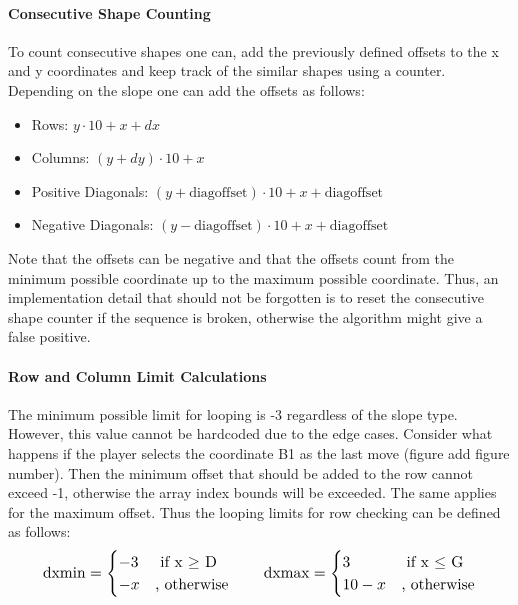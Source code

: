 \documentclass[conference]{IEEEtran}
\begin{document}
\paragraph{Consecutive Shape Counting}
To count consecutive shapes one can, add the previously defined offsets to the x and y coordinates and keep track of the similar shapes using a counter. Depending on the slope one can add the offsets as follows:
\begin{itemize}
\item Rows: \(y \cdot 10 + x + dx \)
\item Columns: \((y + dy) \cdot 10 + x\) 
\item Positive Diagonals: \((y + \text{diagoffset}) \cdot 10 + x + \text{diagoffset}\)
\item Negative Diagonals: \((y - \text{diagoffset}) \cdot 10 + x + \text{diagoffset}\)
\end{itemize} \hfill \hfill
\par Note that the offsets can be negative and that the offsets count from the minimum possible coordinate up to the maximum possible coordinate. Thus, an implementation detail that should not be forgotten is to reset the consecutive shape counter if the sequence is broken, otherwise the algorithm might give a false positive. \\
\paragraph{Row and Column Limit Calculations} The minimum possible limit for looping is -3 regardless of the slope type. However, this value cannot be hardcoded due to the edge cases. Consider what happens if the player selects the coordinate B1 as the last move (figure add figure number). Then the minimum offset that should be added to the row cannot exceed -1, otherwise the array index bounds will be exceeded. The same applies for the maximum offset. Thus the looping limits for row checking can be defined as follows: \begin{equation}\resizebox{0.9\hsize}{!}{$
\text{dxmin} =
\begin{cases}
 -3 &\text{ if x \(\geq\) D} \\ -x &\text{, otherwise} 
\end{cases} \qquad 
\text{dxmax} =
\begin{cases}
 3 &\text{ if x \(\leq\) G} \\ 10-x &\text{, otherwise} 
\end{cases}$}
\end{equation} \\
\end{document}

